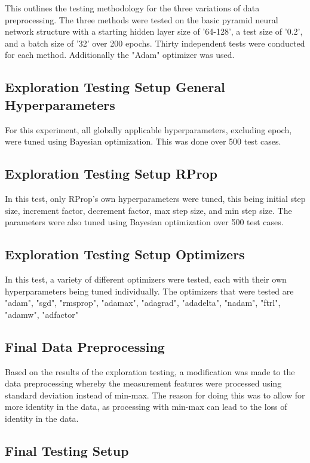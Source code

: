 \documentclass[conference]{IEEEtran}
\begin{document}
This outlines the testing methodology for the three variations of data preprocessing. The three methods were tested on the basic pyramid neural network structure with a starting hidden layer size of '64-128', a test size of '0.2', and a batch size of '32' over 200 epochs. Thirty independent tests were conducted for each method. Additionally the "Adam" optimizer was used.

\subsection{Exploration Testing Setup General Hyperparameters}

For this experiment, all globally applicable hyperparameters, excluding epoch, were tuned using Bayesian optimization. This was done over 500 test cases.

\subsection{Exploration Testing Setup RProp}

In this test, only RProp's own hyperparameters were tuned, this being initial step size, increment factor, decrement factor, max step size, and min step size. The parameters were also tuned using Bayesian optimization over 500 test cases. 

\subsection{Exploration Testing Setup Optimizers}

In this test, a variety of different optimizers were tested, each with their own hyperparameters being tuned individually. The optimizers that were tested are "adam", "sgd", "rmsprop", "adamax", "adagrad", "adadelta", "nadam", "ftrl", "adamw", "adfactor"

\subsection{Final Data Preprocessing}

Based on the results of the exploration testing, a modification was made to the data preprocessing whereby the measurement features were processed using standard deviation instead of min-max. The reason for doing this was to allow for more identity in the data, as processing with min-max can lead to the loss of identity in the data.

\subsection{Final Testing Setup}
\end{document}
